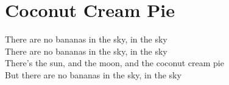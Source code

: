 \section{Coconut Cream Pie}
There are no bananas in the sky, in the sky\\
There are no bananas in the sky, in the sky\\
There's the sun, and the moon, and the coconut cream pie\\
But there are no bananas in the sky, in the sky